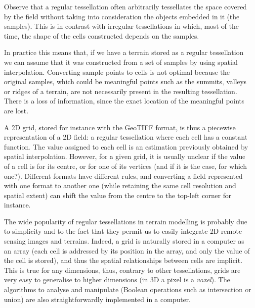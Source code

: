 %

Observe that a regular tessellation often arbitrarily tessellates the space covered by the field without taking into consideration the objects embedded in it (the samples). 
This is in contrast with irregular tessellations in which, most of the time, the shape of the cells constructed depends on the samples.

In practice this means that, if we have a terrain stored as a regular tessellation we can assume that it was constructed from a set of samples by using spatial interpolation.
Converting sample points to cells is not optimal because the original samples, which could be meaningful points such as the summits, valleys or ridges of a terrain, are not necessarily present in the resulting tessellation. 
There is a loss of information, since the exact location of the meaningful points are lost.

%

\begin{floatbox}
\begin{kaobox-practice}[frametitle=\faCog\ Concrete example: a 2D grid]
  A 2D grid, stored for instance with the GeoTIFF format, is thus a piecewise representation of a 2D field: a regular tessellation where each cell has a constant function.
  The value assigned to each cell is an estimation previously obtained by spatial interpolation.
  However, for a given grid, it is usually unclear if the value of a cell is for its centre, or for one of its vertices (and if it is the case, for which one?).
  Different formats have different rules, and converting a field represented with one format to another one (while retaining the same cell resolution and spatial extent) can shift the value from the centre to the top-left corner for instance.
\end{kaobox-practice}
\end{floatbox}

%

The wide popularity of regular tessellations in terrain modelling is probably due to simplicity and to the fact that they permit us to easily integrate 2D remote sensing images and terrains.
Indeed, a grid is naturally stored in a computer as an array (each cell is addressed by its position in the array, and only the value of the cell is stored), and thus the spatial relationships between cells are implicit. 
This is true for any dimensions, thus, contrary to other tessellations, grids are very easy to generalise to higher dimensions (in 3D a pixel is a \emph{voxel}).%
The algorithms to analyse and manipulate (Boolean operations such as intersection or union) are also straightforwardly implemented in a computer. 

